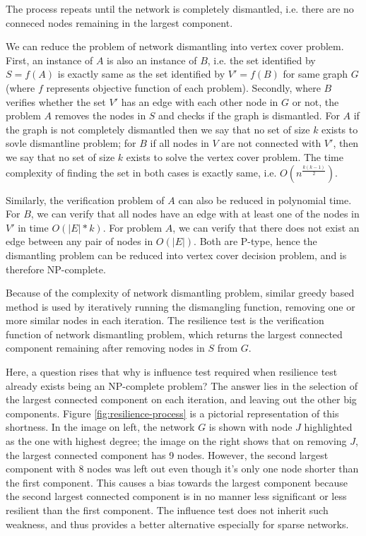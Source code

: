 	The process repeats until the network is completely dismantled, i.e. there are no conneced nodes remaining in the largest component.
	
	We can reduce the problem of network dismantling into vertex cover problem. First, an instance of $A$ is also an instance of $B$, i.e. the set identified by $S=f(A)$ is exactly same as the set identified by $V'=f(B)$ for same graph $G$ (where $f$ represents objective function of each problem). Secondly, where $B$ verifies whether the set $V'$ has an edge with each other node in $G$ or not, the problem $A$ removes the nodes in $S$ and checks if the graph is dismantled. For $A$ if the graph is not completely dismantled then we say that no set of size $k$ exists to sovle dismantline problem; for $B$ if all nodes in $V$ are not connected with $V'$, then we say that no set of size $k$ exists to solve the vertex cover problem. The time complexity of finding the set in both cases is exactly same, i.e. $O(n^{\frac{k(k-1)}{2}})$.
	
	Similarly, the verification problem of $A$ can also be reduced in polynomial time. For $B$, we can verify that all nodes have an edge with at least one of the nodes in $V'$ in time $O(|E|*k)$. For problem $A$, we can verify that there does not exist an edge between any pair of nodes in $O(|E|)$. Both are P-type, hence the dismantling problem can be reduced into vertex cover decision problem, and is therefore NP-complete.
	
	Because of the complexity of network dismantling problem, similar greedy based method is used by iteratively running the dismangling function, removing one or more similar nodes in each iteration. The resilience test is the verification function of network dismantling problem, which returns the largest connected component remaining after removing nodes in $S$ from $G$.
	
	Here, a question rises that why is influence test required when resilience test already exists being an NP-complete problem? The answer lies in the selection of the largest connected component on each iteration, and leaving out the other big components. Figure \ref{fig:resilience-process} is a pictorial representation of this shortness. In the image on left, the network $G$ is shown with node $J$ highlighted as the one with highest degree; the image on the right shows that on removing $J$, the largest connected component has 9 nodes. However, the second largest component with 8 nodes was left out even though it's only one node shorter than the first component. This causes a bias towards the largest component because the second largest connected component is in no manner less significant or less resilient than the first component. The influence test does not inherit such weakness, and thus provides a better alternative especially for sparse networks. \\
	
